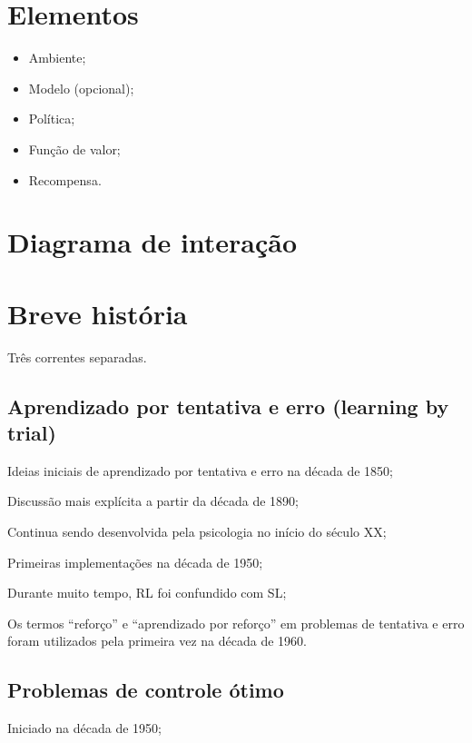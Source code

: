 \documentclass{article}
\begin{document}
    \section{Elementos}
    
        \begin{itemize}
            \item Ambiente;
            \item Modelo (opcional);
            \item Política;
            \item Função de valor;
            \item Recompensa.
        \end{itemize}
        
    \section{Diagrama de interação}
    
        \begin{center}
            \rlinteraction
        \end{center}
    
    \section{Breve história}
    
        Três correntes separadas.
        
        \subsection{Aprendizado por tentativa e erro (learning by trial)}
            Ideias iniciais de aprendizado por tentativa e erro na década de 1850;
            
            Discussão mais explícita a partir da década de 1890;
            
            Continua sendo desenvolvida pela psicologia no início do século XX;
            
            Primeiras implementações na década de 1950;
            
            Durante muito tempo, RL foi confundido com SL;
            
            Os termos “reforço” e “aprendizado por reforço” em problemas de tentativa e erro foram utilizados pela primeira vez na década de 1960.
    
        
        \subsection{Problemas de controle ótimo}
            Iniciado na década de 1950;
            
\end{document}
